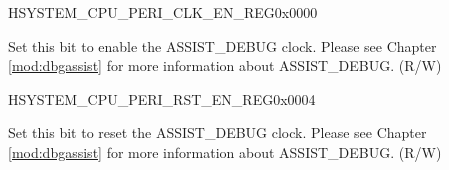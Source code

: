 \begin{register}{H}{SYSTEM\_CPU\_PERI\_CLK\_EN\_REG}{0x0000}\label{regdesc:SYSTEMCPUPERICLKENREG}
%
%
%
\regnewline%
\begin{regdesc}\begin{reglist}
\label{fielddesc:SYSTEMCLKENASSISTDEBUG}\item [SYSTEM\_CLK\_EN\_ASSIST\_DEBUG] Set this bit to enable the ASSIST\_DEBUG clock. Please see Chapter \ref{mod:dbgassist}
\textit{} for more information about ASSIST\_DEBUG. (R/W)
\end{reglist}\end{regdesc}
\end{register}


\begin{register}{H}{SYSTEM\_CPU\_PERI\_RST\_EN\_REG}{0x0004}\label{regdesc:SYSTEMCPUPERIRSTENREG}
%
%
%
\regnewline%
\begin{regdesc}\begin{reglist}
\label{fielddesc:SYSTEMRSTENASSISTDEBUG}\item [SYSTEM\_RST\_EN\_ASSIST\_DEBUG] Set this bit to reset the ASSIST\_DEBUG clock. Please see Chapter \ref{mod:dbgassist}
\textit{} for more information about ASSIST\_DEBUG. (R/W)
\end{reglist}\end{regdesc}
\end{register}

